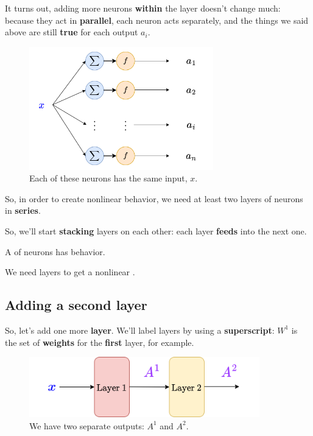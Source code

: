         
        It turns out, adding more neurons \textbf{within} the layer doesn't change much: because they act in \textbf{parallel}, each neuron acts separately, and the things we said above are still \textbf{true} for each output $a_i$.
        
        \begin{figure}[H]
            \centering
            \includegraphics[width=80mm,scale=0.4]{images/nn_images/remove_input.png}
            \caption*{Each of these neurons has the same input, $x$.}
        \end{figure}
        
        So, in order to create nonlinear behavior, we need at least two layers of neurons in \textbf{series}.
        
        So, we'll start \textbf{stacking} layers on each other: each layer \textbf{feeds} into the next one.\\
        
        \begin{concept}
            A  of neurons has  behavior.
            
            We need  layers to get a nonlinear .
        \end{concept}
    
    \subsection{Adding a second layer}
    
        So, let's add one more \textbf{layer}. We'll label layers by using a \textbf{superscript}: $W^1$ is the set of \textbf{weights} for the \textbf{first} layer, for example.
        
        \begin{figure}[H]
            \centering
            \includegraphics[width=100mm,scale=0.4]{images/nn_images/two_layers.png}
            \caption*{We have two separate outputs: $A^1$ and $A^2$.}
        \end{figure}
        
